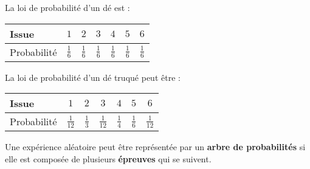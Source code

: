 \documentclass[
	classe=$2^{de}$
]{coursclass}
\begin{document}
\begin{exemple}
	\begin{multicols}{2}
		La loi de probabilité d'un dé est :
		\begin{center}
			\begin{tabular}{|l|c|c|c|c|c|c|}
				\hline
				Issue       & $1$           & $2$           & $3$           & $4$           & $5$           & $6$           \\ \hline
				Probabilité & $\frac{1}{6}$ & $\frac{1}{6}$ & $\frac{1}{6}$ & $\frac{1}{6}$ & $\frac{1}{6}$ & $\frac{1}{6}$ \\ \hline
			\end{tabular}
		\end{center}

		\columnbreak

		La loi de probabilité d'un dé truqué peut être :
		\begin{center}
			\begin{tabular}{|l|c|c|c|c|c|c|}
				\hline
				Issue       & $1$            & $2$           & $3$            & $4$           & $5$           & $6$            \\ \hline
				Probabilité & $\frac{1}{12}$ & $\frac{1}{3}$ & $\frac{1}{12}$ & $\frac{1}{4}$ & $\frac{1}{6}$ & $\frac{1}{12}$ \\ \hline
			\end{tabular}
		\end{center}
	\end{multicols}
\end{exemple}

\begin{definition}
	Une expérience aléatoire peut être représentée par un \textbf{arbre de probabilités} si elle est composée de plusieurs \textbf{épreuves} qui se suivent.
\end{definition}
\end{document}
